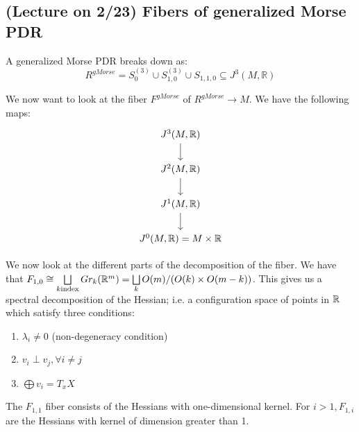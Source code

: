 \documentclass{article}
\newtheorem{proposed work}[theorem]{Proposed Work}
\begin{document}
\subsection{(Lecture on 2/23) Fibers of generalized Morse PDR}
A generalized Morse PDR breaks down as:
$$ R^{gMorse}=S_0^{(3)}\cup S_{1,0}^{(3)}\cup S_{1,1,0}\subseteq J^3(M, \mathbb{R})$$

We now want to look at the fiber $F^{gMorse}$ of $R^{gMorse}\to M$. We have the following maps:
\begin{equation*}
\begin{tikzcd}
J^3(M,\R)\arrow[d]\\
J^2(M,\R)\arrow[d]\\
J^1(M,\R)\arrow[d]\\
J^0(M,\R)=M\times \R
\end{tikzcd}
\end{equation*}

We now look at the different parts of the decomposition of the fiber. We have that $F_{1,0}\cong \bigsqcup\limits_{k \text{index}} Gr_k(\mathbb R^m)=\bigsqcup\limits_{k}O(m)/(O(k)\times O(m-k))$. This gives us a spectral decomposition of the Hessian; i.e. a configuration space of points in $\mathbb R$ which satisfy three conditions:
\begin{enumerate}
\item $\lambda_i\neq 0$ (non-degeneracy condition)
\item $v_i\perp v_j, \forall i\neq j$
\item $\bigoplus v_i=T_xX$
\end{enumerate}
\begin{center}
\end{center}

The $F_{1,1}$ fiber consists of the Hessians with one-dimensional kernel. For $i>1, F_{1,i}$ are the Hessians with kernel of dimension greater than 1. \\
\end{document}
